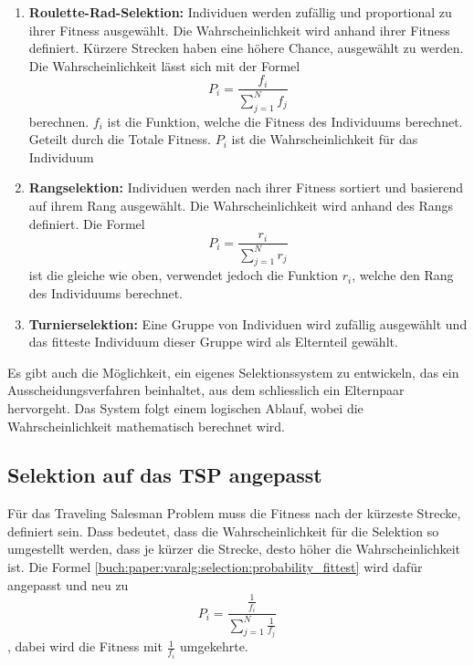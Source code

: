 \begin{enumerate}
    \item \textbf{Roulette-Rad-Selektion:} Individuen werden zufällig und
    proportional zu ihrer Fitness ausgewählt. Die Wahrscheinlichkeit wird 
    anhand ihrer Fitness definiert. Kürzere Strecken haben eine höhere Chance, 
    ausgewählt zu werden. Die Wahrscheinlichkeit lässt sich mit der Formel
    \begin{equation}
        P_i
        =
        \frac{f_i}{\sum_{j=1}^{N} f_j}
        \label{buch:paper:varalg:selection:probability_fittest}
    \end{equation}
    berechnen. \(f_i\) ist die Funktion, welche die Fitness des Individuums berechnet.
    Geteilt durch die Totale Fitness. \(P_i\) ist die Wahrscheinlichkeit für das Individuum
    \item \textbf{Rangselektion:} Individuen werden nach ihrer Fitness sortiert und basierend
    auf ihrem Rang ausgewählt. Die Wahrscheinlichkeit wird anhand des Rangs definiert. Die 
    Formel 
    \begin{equation}
        P_i
        =
        \frac{r_i}{\sum_{j=1}^{N} r_j}
        \label{buch:paper:varalg:selection:probability_rating}
    \end{equation}
    ist die gleiche wie oben, verwendet jedoch die Funktion \(r_i\), welche den 
    Rang des Individuums berechnet.
    \item \textbf{Turnierselektion:} Eine Gruppe von Individuen wird zufällig ausgewählt
    und das fitteste Individuum dieser Gruppe wird als Elternteil gewählt.
\end{enumerate}
Es gibt auch die Möglichkeit, ein eigenes Selektionssystem zu entwickeln, 
das ein Ausscheidungsverfahren beinhaltet, aus dem schliesslich ein 
Elternpaar hervorgeht. Das System folgt einem logischen Ablauf, wobei 
die Wahrscheinlichkeit mathematisch berechnet wird.

\subsection{Selektion auf das TSP angepasst
\label{buch:paper:varalg:subsection:selection_tsp}}
Für das Traveling Salesman Problem muss die Fitness nach der kürzeste Strecke,
definiert sein. Dass bedeutet, dass die Wahrscheinlichkeit für die Selektion
so umgestellt werden, dass je kürzer die Strecke, desto höher die Wahrscheinlichkeit
ist. Die Formel \ref{buch:paper:varalg:selection:probability_fittest} wird 
dafür angepasst und neu zu
\begin{equation}
    P_i
    =
    \frac{\frac{1}{f_i}}{\sum_{j=1}^{N} \frac{1}{f_j}}
    \label{buch:paper:varalg:selection:probability_fittest_tsp}
\end{equation}
, dabei wird die Fitness mit \(\frac{1}{f_i}\) umgekehrte.

